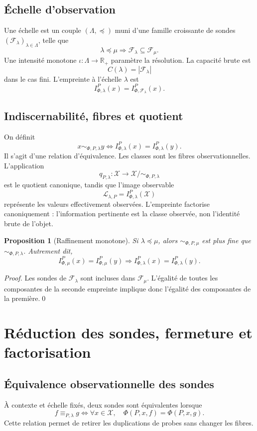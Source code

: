 \documentclass[11pt,a4paper,openany]{book}
\newtheorem{proposition}[definition]{Proposition}
\newcommand{\Rp}{\mathbb{R}_{+}}
\newcommand{\X}{\mathcal X}
\newcommand{\Fset}{\mathcal F}
\begin{document}
\section{Échelle d'observation}
Une échelle est un couple \((\Lambda,\preceq)\) muni d'une famille croissante de sondes \((\Fset_\lambda)_{\lambda\in\Lambda}\), telle que
\[
\lambda\preceq\mu\Longrightarrow
\Fset_\lambda\subseteq\Fset_\mu.
\]
Une intensité monotone \(\iota:\Lambda\to\Rp\) paramètre la résolution. La capacité brute est
\[
C(\lambda)=|\Fset_\lambda|
\]
dans le cas fini. L'empreinte à l'échelle \(\lambda\) est
\[
I_{\Phi,\lambda}^{P}(x)=I_{\Phi,\Fset_\lambda}^{P}(x).
\]

\section{Indiscernabilité, fibres et quotient}
On définit
\[
x\sim_{\Phi,P,\lambda} y
\iff
I_{\Phi,\lambda}^{P}(x)=I_{\Phi,\lambda}^{P}(y).
\]
Il s'agit d'une relation d'équivalence. Les classes sont les fibres observationnelles. L'application
\[
q_{P,\lambda}:\X\to\X/{\sim_{\Phi,P,\lambda}}
\]
est le quotient canonique, tandis que l'image observable
\[
\mathcal L_{\lambda,P}=I_{\Phi,\lambda}^{P}(\X)
\]
représente les valeurs effectivement observées. L'empreinte factorise canoniquement : l'information pertinente est la classe observée, non l'identité brute de l'objet.

\begin{proposition}[Raffinement monotone]
Si \(\lambda\preceq\mu\), alors \(\sim_{\Phi,P,\mu}\) est plus fine que \(\sim_{\Phi,P,\lambda}\). Autrement dit,
\[
I_{\Phi,\mu}^{P}(x)=I_{\Phi,\mu}^{P}(y)
\Longrightarrow
I_{\Phi,\lambda}^{P}(x)=I_{\Phi,\lambda}^{P}(y).
\]
\end{proposition}
\begin{proof}
Les sondes de \(\Fset_\lambda\) sont incluses dans \(\Fset_\mu\). L'égalité de toutes les composantes de la seconde empreinte implique donc l'égalité des composantes de la première.\qed
\end{proof}

\chapter{Réduction des sondes, fermeture et factorisation}
\section{Équivalence observationnelle des sondes}
À contexte et échelle fixés, deux sondes sont équivalentes lorsque
\[
f\equiv_{P,\lambda}g
\iff
\forall x\in\X,\quad
\Phi(P,x,f)=\Phi(P,x,g).
\]
Cette relation permet de retirer les duplications de probes sans changer les fibres.
\end{document}
